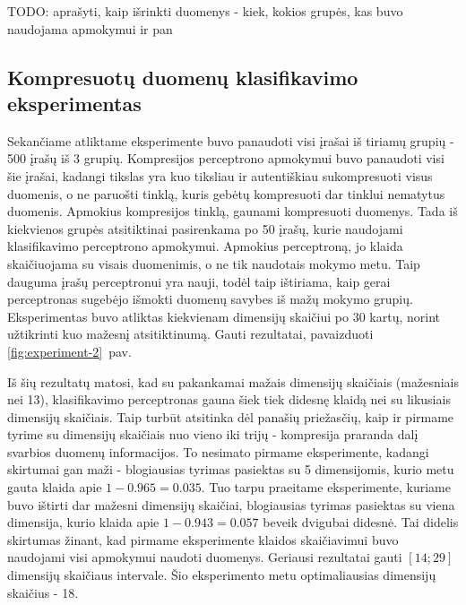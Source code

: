 \documentclass{VUMIFPSbakalaurinis}
\newcommand{\TODO}[1]{
\colorbox{todo-background-color}{TODO: #1}
}
\begin{document}
\TODO{aprašyti, kaip išrinkti duomenys - kiek, kokios grupės, kas buvo naudojama apmokymui ir pan}

\subsection{Kompresuotų duomenų klasifikavimo eksperimentas}

Sekančiame atliktame eksperimente buvo panaudoti visi įrašai iš tiriamų grupių - 500 įrašų iš 3 grupių.
Kompresijos perceptrono apmokymui buvo panaudoti visi šie įrašai, kadangi tikslas yra kuo tiksliau ir autentiškiau sukompresuoti visus duomenis, o ne paruošti tinklą, kuris gebėtų kompresuoti dar tinklui nematytus duomenis.
Apmokius kompresijos tinklą, gaunami kompresuoti duomenys.
Tada iš kiekvienos grupės atsitiktinai pasirenkama po 50 įrašų, kurie naudojami klasifikavimo perceptrono apmokymui.
Apmokius perceptroną, jo klaida skaičiuojama su visais duomenimis, o ne tik naudotais mokymo metu.
Taip dauguma įrašų perceptronui yra nauji, todėl taip ištiriama, kaip gerai perceptronas sugebėjo išmokti duomenų savybes iš mažų mokymo grupių.
Eksperimentas buvo atliktas kiekvienam dimensijų skaičiui po 30 kartų, norint užtikrinti kuo mažesnį atsitiktinumą.
Gauti rezultatai, pavaizduoti \ref{fig:experiment-2}~pav.

Iš šių rezultatų matosi, kad su pakankamai mažais dimensijų skaičiais (mažesniais nei 13), klasifikavimo perceptronas gauna šiek tiek didesnę klaidą nei su likusiais dimensijų skaičiais.
Taip turbūt atsitinka dėl panašių priežasčių, kaip ir pirmame tyrime su dimensijų skaičiais nuo vieno iki trijų - kompresija praranda dalį svarbios duomenų informacijos.
To nesimato pirmame eksperimente, kadangi skirtumai gan maži - blogiausias tyrimas pasiektas su 5 dimensijomis, kurio metu gauta klaida apie $1 - 0.965 = 0.035$.
Tuo tarpu praeitame eksperimente, kuriame buvo ištirti dar mažesni dimensijų skaičiai, blogiausias tyrimas pasiektas su viena dimensija, kurio klaida apie $1 - 0.943 = 0.057$ beveik dvigubai didesnė.
Tai didelis skirtumas žinant, kad pirmame eksperimente klaidos skaičiavimui buvo naudojami visi apmokymui naudoti duomenys.
Geriausi rezultatai gauti $[14; 29]$ dimensijų skaičiaus intervale.
Šio eksperimento metu optimaliausias dimensijų skaičius - 18.
\end{document}
